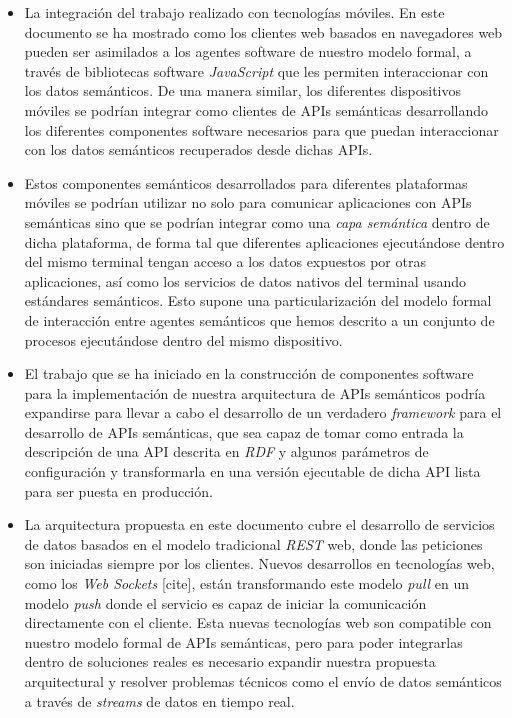 \begin{itemize}
  \item La integraci\'on del trabajo realizado con tecnolog\'ias m\'oviles. En este documento se ha mostrado como los clientes web basados en navegadores web pueden ser asimilados a los agentes software de nuestro modelo formal, a trav\'es de bibliotecas software \textit{JavaScript} que les permiten interaccionar con los datos sem\'anticos. De una manera similar, los diferentes dispositivos m\'oviles se podr\'ian integrar como clientes de APIs sem\'anticas desarrollando los diferentes componentes software necesarios para que puedan interaccionar con los datos sem\'anticos recuperados desde dichas APIs. 
  \item Estos componentes sem\'anticos desarrollados para diferentes plataformas m\'oviles se podr\'ian utilizar no solo para comunicar aplicaciones con APIs sem\'anticas sino que se podr\'ian integrar como una \textit{capa sem\'antica} dentro de dicha plataforma, de forma tal que diferentes aplicaciones ejecut\'andose dentro del mismo terminal tengan acceso a los datos expuestos por otras aplicaciones, as\'i como los servicios de datos nativos del terminal usando est\'andares sem\'anticos. Esto supone una particularizaci\'on del modelo formal de interacci\'on entre agentes sem\'anticos que hemos descrito a un conjunto de procesos ejecut\'andose dentro del mismo dispositivo.
  \item El trabajo que se ha iniciado en la construcci\'on de componentes software para la implementaci\'on de nuestra arquitectura de APIs sem\'anticos podr\'ia expandirse para llevar a cabo el desarrollo de un verdadero \textit{framework} para el desarrollo de APIs sem\'anticas, que sea capaz de tomar como entrada la descripci\'on de una API descrita en \textit{RDF} y algunos par\'ametros de configuraci\'on y transformarla en una versi\'on ejecutable de dicha API lista para ser puesta en producci\'on.
  \item La arquitectura propuesta en este documento cubre el desarrollo de servicios de datos basados en el modelo tradicional \textit{REST} web, donde las peticiones son iniciadas siempre por los clientes. Nuevos desarrollos en tecnolog\'ias web, como los \textit{Web Sockets} [cite], est\'an transformando este modelo \textit{pull} en un modelo \textit{push} donde el servicio es capaz de iniciar la comunicaci\'on directamente con el cliente. Esta nuevas tecnolog\'ias web son compatible con nuestro modelo formal de APIs sem\'anticas, pero para poder integrarlas dentro de soluciones reales es necesario expandir nuestra propuesta arquitectural y resolver problemas t\'ecnicos como el env\'io de datos sem\'anticos a trav\'es de \textit{streams} de datos en tiempo real.

\end{itemize}
